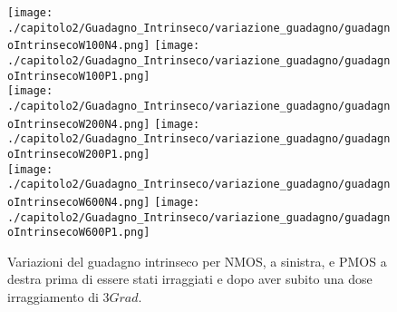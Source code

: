 \begin{figure}[ht]
    \centering
    \texttt{[image: ./capitolo2/Guadagno\_Intrinseco/variazione\_guadagno/guadagnoIntrinsecoW100N4.png]}
    \texttt{[image: ./capitolo2/Guadagno\_Intrinseco/variazione\_guadagno/guadagnoIntrinsecoW100P1.png]}\\
    \vspace{0.2cm}
    \texttt{[image: ./capitolo2/Guadagno\_Intrinseco/variazione\_guadagno/guadagnoIntrinsecoW200N4.png]}
    \texttt{[image: ./capitolo2/Guadagno\_Intrinseco/variazione\_guadagno/guadagnoIntrinsecoW200P1.png]}\\
    \vspace{0.2cm}
    \texttt{[image: ./capitolo2/Guadagno\_Intrinseco/variazione\_guadagno/guadagnoIntrinsecoW600N4.png]}
    \texttt{[image: ./capitolo2/Guadagno\_Intrinseco/variazione\_guadagno/guadagnoIntrinsecoW600P1.png]}

    \caption[Variazione del guadagno intrinseco pre e post irraggiamento]{Variazioni del guadagno intrinseco per NMOS, a sinistra, e PMOS a destra prima di essere stati irraggiati e dopo aver subito una dose irraggiamento di $3Grad$.}
    \label{fig:variazione_guadagnoIntrinseco}
\end{figure}